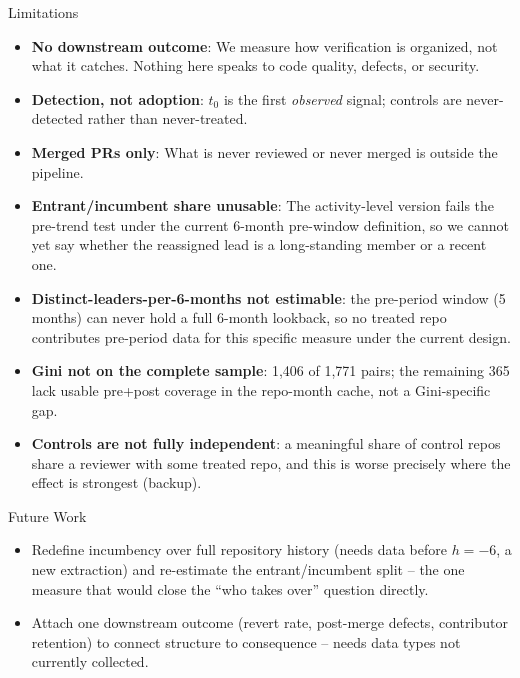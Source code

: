 \begin{frame}{Limitations}
\begin{itemize}
  \item \textbf{No downstream outcome}: We measure how verification is
        organized, not what it catches. Nothing here speaks to code
        quality, defects, or security.
  \item \textbf{Detection, not adoption}: $t_0$ is the first
        \emph{observed} signal; controls are never-detected rather than
        never-treated.
  \item \textbf{Merged PRs only}: What is never reviewed or never
        merged is outside the pipeline.
  \item \textbf{Entrant/incumbent share unusable}: The activity-level
        version fails the pre-trend test under the current 6-month
        pre-window definition, so we cannot yet say whether the
        reassigned lead is a long-standing member or a recent one.
  \item \textbf{Distinct-leaders-per-6-months not estimable}: the
        pre-period window (5 months) can never hold a full 6-month
        lookback, so no treated repo contributes pre-period data for
        this specific measure under the current design.
  \item \textbf{Gini not on the complete sample}: 1,406 of 1,771 pairs;
        the remaining 365 lack usable pre+post coverage in the
        repo-month cache, not a Gini-specific gap.
  \item \textbf{Controls are not fully independent}: a meaningful share
        of control repos share a reviewer with some treated repo, and
        this is worse precisely where the effect is strongest (backup).
\end{itemize}
\end{frame}

\begin{frame}{Future Work}
\begin{itemize}
  \item Redefine incumbency over full repository history (needs data
        before $h=-6$, a new extraction) and re-estimate the
        entrant/incumbent split -- the one measure that would close the
        ``who takes over'' question directly.
  \item Attach one downstream outcome (revert rate, post-merge defects,
        contributor retention) to connect structure to consequence --
        needs data types not currently collected.
\end{itemize}
\end{frame}

